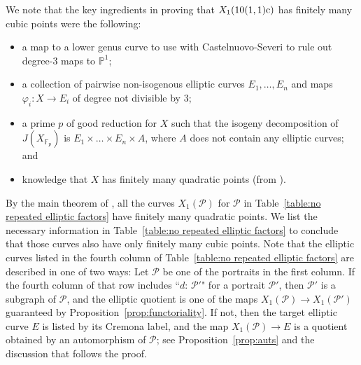 \documentclass[12pt]{amsart}
\theoremstyle{definition}
\newcommand{\bbF}{\mathbb{F}}
\newcommand{\calP}{\mathcal{P}}
\numberwithin{equation}{section}
\begin{document}
We note that the key ingredients in proving that $X_1(\rm 10(1,1)c)$ has finitely many cubic points were the following:
\begin{itemize}
    \item a map to a lower genus curve to use with Castelnuovo-Severi to rule out degree-$3$ maps to $\mathbb{P}^1$;
    \item a collection of pairwise non-isogenous elliptic curves $E_1,\ldots,E_n$ and maps $\varphi_i : X \to E_i$ of degree not divisible by $3$;
    \item a prime $p$ of good reduction for $X$ such that the isogeny decomposition of $J(X_{\bbF_p})$ is $E_1 \times \ldots \times E_n \times A$, where $A$ does not contain any elliptic curves; and
    \item knowledge that $X$ has finitely many quadratic points (from \cite{doyle/krumm:2024}).
\end{itemize}

By the main theorem of \cite{doyle/krumm:2024}, all the curves $X_1(\mathcal{P})$ for $\mathcal{P}$ in Table~\ref{table:no repeated elliptic factors} have finitely many quadratic points. We list the necessary information in Table~\ref{table:no repeated elliptic factors} to conclude that those curves also have only finitely many cubic points. Note that the elliptic curves listed in the fourth column of Table~\ref{table:no repeated elliptic factors} are described in one of two ways: Let $\calP$ be one of the portraits in the first column. If the fourth column of that row includes ``$d$: $\calP'$" for a portrait $\calP'$, then $\calP'$ is a subgraph of $\calP$, and the elliptic quotient is one of the maps $X_1(\calP)\to X_1(\calP')$ guaranteed by Proposition~\ref{prop:functoriality}. If not, then the target elliptic curve $E$ is listed by its Cremona label, and the map $X_1(\calP)\to E$ is a quotient obtained by an automorphism of $\calP$; see Proposition~\ref{prop:auts} and the discussion that follows the proof.
\end{document}
